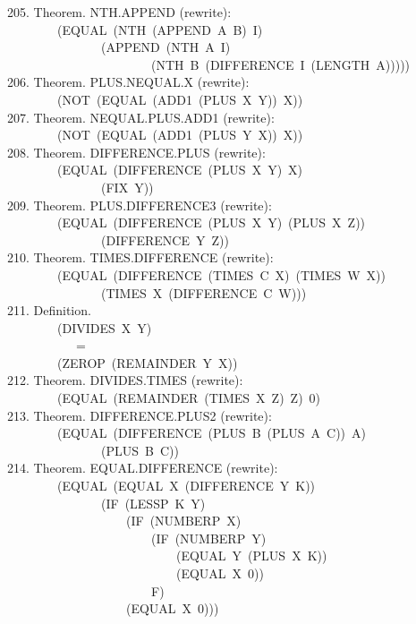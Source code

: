\documentclass[10pt]{book}
\newenvironment{pubasis}{\begin{flushleft}}{\end{flushleft}}
\begin{document}
\begin{pubasis}
205.    Theorem.  NTH.APPEND (rewrite):\\
~~~~~~~~(EQUAL~(NTH~(APPEND~A~B)~I)\\
~~~~~~~~~~~~~~~(APPEND~(NTH~A~I)\\
~~~~~~~~~~~~~~~~~~~~~~~(NTH~B~(DIFFERENCE~I~(LENGTH~A)))))\\

206.    Theorem.  PLUS.NEQUAL.X (rewrite):\\
~~~~~~~~(NOT~(EQUAL~(ADD1~(PLUS~X~Y))~X))\\

207.    Theorem.  NEQUAL.PLUS.ADD1 (rewrite):\\
~~~~~~~~(NOT~(EQUAL~(ADD1~(PLUS~Y~X))~X))\\

208.    Theorem.  DIFFERENCE.PLUS (rewrite):\\
~~~~~~~~(EQUAL~(DIFFERENCE~(PLUS~X~Y)~X)\\
~~~~~~~~~~~~~~~(FIX~Y))\\

209.    Theorem.  PLUS.DIFFERENCE3 (rewrite):\\
~~~~~~~~(EQUAL~(DIFFERENCE~(PLUS~X~Y)~(PLUS~X~Z))\\
~~~~~~~~~~~~~~~(DIFFERENCE~Y~Z))\\

210.    Theorem.  TIMES.DIFFERENCE (rewrite):\\
~~~~~~~~(EQUAL~(DIFFERENCE~(TIMES~C~X)~(TIMES~W~X))\\
~~~~~~~~~~~~~~~(TIMES~X~(DIFFERENCE~C~W)))\\

211.    Definition.\\
~~~~~~~~(DIVIDES~X~Y)\\
~~~~~~~~~~~=\\
~~~~~~~~(ZEROP~(REMAINDER~Y~X))\\

212.    Theorem.  DIVIDES.TIMES (rewrite):\\
~~~~~~~~(EQUAL~(REMAINDER~(TIMES~X~Z)~Z)~0)\\

213.    Theorem.  DIFFERENCE.PLUS2 (rewrite):\\
~~~~~~~~(EQUAL~(DIFFERENCE~(PLUS~B~(PLUS~A~C))~A)\\
~~~~~~~~~~~~~~~(PLUS~B~C))\\

214.    Theorem.  EQUAL.DIFFERENCE (rewrite):\\
~~~~~~~~(EQUAL~(EQUAL~X~(DIFFERENCE~Y~K))\\
~~~~~~~~~~~~~~~(IF~(LESSP~K~Y)\\
~~~~~~~~~~~~~~~~~~~(IF~(NUMBERP~X)\\
~~~~~~~~~~~~~~~~~~~~~~~(IF~(NUMBERP~Y)\\
~~~~~~~~~~~~~~~~~~~~~~~~~~~(EQUAL~Y~(PLUS~X~K))\\
~~~~~~~~~~~~~~~~~~~~~~~~~~~(EQUAL~X~0))\\
~~~~~~~~~~~~~~~~~~~~~~~F)\\
~~~~~~~~~~~~~~~~~~~(EQUAL~X~0)))\\


\end{pubasis}
\end{document}
